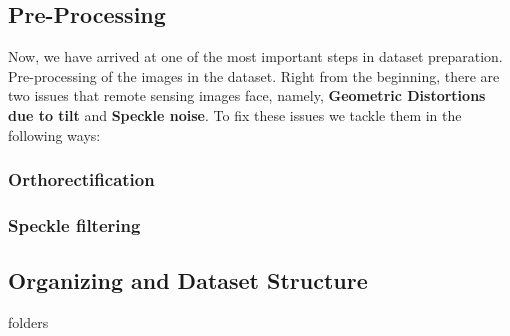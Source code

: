 \subsection{Pre-Processing}

Now, we have arrived at one of the most important steps in dataset preparation. Pre-processing of the images in the dataset. Right from the beginning, there are two issues that remote sensing images face, namely, \textbf{Geometric Distortions due to tilt} and \textbf{Speckle noise}. To fix these issues we tackle them in the following ways:

\subsubsection{Orthorectification}

\subsubsection{Speckle filtering}

\subsection{Organizing and Dataset Structure}

folders